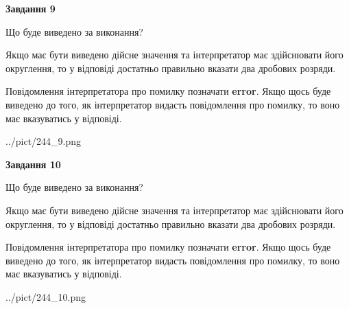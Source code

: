 \documentclass[12pt, ukrainian]{article}
\begin{document}
{\begin {Large}
{\begin {center}\textbf{Завдання 9}\end {center}}\par
Що буде виведено за виконання? \par

Якщо має бути виведено дійсне значення та інтерпретатор має здійснювати його округлення, 
то у відповіді достатньо правильно вказати два дробових розряди.

Повідомлення інтерпретатора про помилку позначати \textbf{error}.
Якщо щось буде виведено до того, як інтерпретатор видасть повідомлення про помилку, 
то воно має вказуватись у відповіді. \par

\begin{center}
	{../pict/244_9.png}
\end{center}
\newpage

{\begin {center}\textbf{Завдання 10}\end {center}}\par
Що буде виведено за виконання? \par

Якщо має бути виведено дійсне значення та інтерпретатор має здійснювати його округлення, 
то у відповіді достатньо правильно вказати два дробових розряди.

Повідомлення інтерпретатора про помилку позначати \textbf{error}.
Якщо щось буде виведено до того, як інтерпретатор видасть повідомлення про помилку, 
то воно має вказуватись у відповіді. \par

\begin{center}
	{../pict/244_10.png}
\end{center}
\newpage

\end {Large}}
\end{document}
